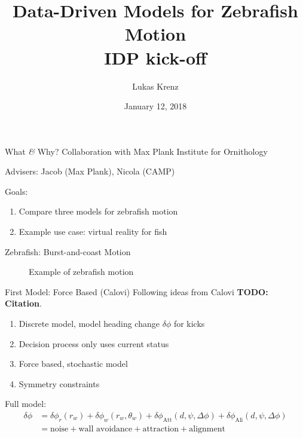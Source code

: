 \documentclass{beamer}
\title{Data-Driven Models for Zebrafish Motion\\IDP kick-off}
\author{Lukas Krenz}
\date{January 12, 2018}
\newcommand{\cn}{\textbf{TODO: Citation}}
\begin{document}
\maketitle
\begin{frame}{What \textit{\&} Why?}
Collaboration with Max Plank Institute for Ornithology

Advisers: Jacob (Max Plank), Nicola (CAMP)

Goals:
\begin{enumerate}
\item Compare three models for zebrafish motion
\item Example use case: virtual reality for fish
\end{enumerate}
\end{frame}
\begin{frame}{Zebrafish: Burst-and-coast Motion} 
    \begin{figure}[H]
    \centering
    \caption{Example of zebrafish motion}
    \label{fig:calovi-sim}
  \end{figure}
\end{frame}

\begin{frame}{First Model: Force Based (Calovi)}
Following ideas from Calovi \cn. 

\begin{enumerate}
\item Discrete model, model heading change $\delta \phi$ for kicks
\item Decision process only uses current status
\item Force based, stochastic model
\item Symmetry constraints 
\end{enumerate}

Full model:
\begin{align}
  \label{eq:calovi-model}
  \delta \phi &= \delta \phi_r (r_w) + \delta \phi_w (r_w, \theta_w) + \delta \phi_\text{Att} (d, \psi, \Delta \phi) + \delta \phi_\text{Ali}  (d, \psi, \Delta \phi) \\
  &= \text{noise} + \text{wall avoidance} + \text{attraction} + \text{alignment}
\end{align}
\end{frame}
\end{document}
